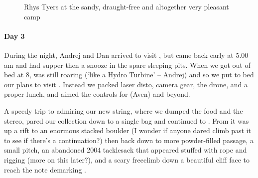 \begin{figure}[t!]
\checkoddpage \ifoddpage \forcerectofloat \else \forceversofloat \fi
\centering
{}
\caption{Rhys Tyers at the sandy, draught-free and altogether very pleasant \protect{} camp }
\label{rhys red cow}
\end{figure}


\paragraph{Day 3}
During the night, Andrej and Dan arrived to visit , but came back early at 5.00\,am and had supper then a snooze in the spare sleeping pits. When we got out of bed at 8,  was still roaring (`like a Hydro Turbine' -- Andrej) and so we put to bed our plans to visit . Instead we packed laser disto, camera gear, the drone, and a proper lunch, and aimed the controls for  (Aven) and beyond.

A speedy trip to  admiring our new string, where we dumped the food and the stereo, pared our collection down to a single bag and continued to .
From  it was up a rift to an enormous stacked boulder (I wonder if anyone dared climb past it to see if there's a continuation?) then back down to more powder-filled passage, a small pitch, an abandoned 2004 tacklesack that appeared stuffed with rope and rigging (more on this later?), and a scary freeclimb down a beautiful cliff face to reach the note demarking .

